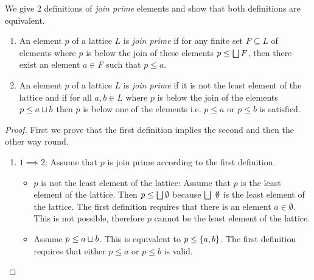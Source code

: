 \begin{definition}
    \label{defJoinPrime}
    We give 2 definitions of \emph{join prime} elements and show that both
    definitions are equivalent.

    \begin{enumerate}
        \item An element $p$ of a lattice $L$ is \emph{join prime} if for any
            finite set $F \subseteq L$ of elements where $p$ is below the join of
            these elements $p \le \bigsqcup F$, then there exist an element $a
            \in F$ such that $p \le a$.

        \item An element $p$ of a lattice $L$ is \emph{join prime} if it is not
            the least element of the lattice and if for all $a,b \in L$ where
            $p$ is below the join of the elements $p \le a \sqcup b$ then $p$ is
            below one of the elements i.e. $p \le a$ or $p \le b$ is satisfied.
    \end{enumerate}

    \begin{proof}
        First we prove that the first definition implies the second and then the
        other way round.

        \begin{enumerate}
            \item $1 \implies 2$: Assume that $p$ is join prime according to the
                first definition.

                \begin{itemize}
                    \item $p$ is not the least element of the lattice: Assume
                        that $p$ is the least element of the lattice. Then $p
                        \le \bigsqcup \emptyset$ because $\bigjoin \emptyset$ is
                        the least element of the lattice. The first definition
                        requires that there is an element $a \in \emptyset$.
                        This is not possible, therefore $p$ cannot be the least
                        element of the lattice.

                    \item Assume $p \le a \sqcup b$. This is equivalent to $p \le
                        \left\{a,b\right\}$. The first definition requires that either $p
                        \le a$ or $p \le b$ is valid.
                \end{itemize}


\end{enumerate}
\end{proof}
\end{definition}
